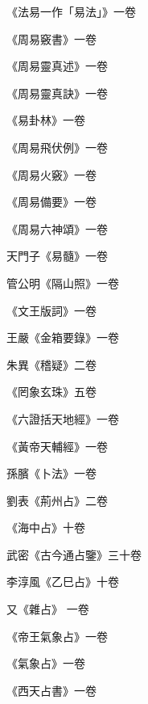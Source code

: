 \begin{pinyinscope}
 《法易一作「易法」》一卷



 《周易竅書》一卷



 《周易靈真述》一卷



 《周易靈真訣》一卷



 《易卦林》一卷



 《周易飛伏例》一卷



 《周易火竅》一卷



 《周易備要》一卷



 《周易六神頌》一卷



 天門子《易髓》一卷



 管公明《隔山照》一卷



 《文王版詞》一卷



 王嚴《金箱要錄》一卷



 朱異《稽疑》二卷



 《罔象玄珠》五卷



 《六證括天地經》一卷



 《黃帝天輔經》一卷



 孫臏《卜法》一卷



 劉表《荊州占》二卷



 《海中占》十卷



 武密《古今通占鑒》三十卷



 李淳風《乙巳占》十卷



 又《雜占》
 一卷



 《帝王氣象占》一卷



 《氣象占》一卷



 《西天占書》一卷




\end{pinyinscope}
